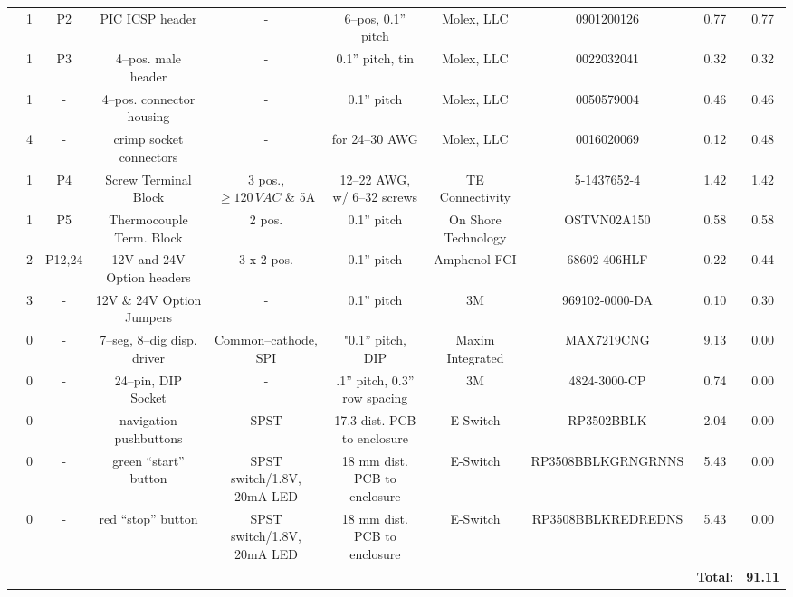 \documentclass[10pt, twocolumn]{article}
\begin{document}
\begin{center}
\begin{adjustbox}{max width=\textwidth}
\begin{tabular}{c c c c c c c c c c}
	&1	&P2	&PIC ICSP header		&-				&6--pos, 0.1” pitch
	&Molex, LLC	&0901200126			&0.77		&0.77	\\

	&1	&P3	&4--pos. male header		&-				&0.1'' pitch, tin
	&Molex, LLC		&0022032041		&0.32		&0.32	\\

	&1	&-	&4--pos. connector housing	&-			&0.1'' pitch
	&Molex, LLC		&0050579004		&0.46		&0.46	\\

	&4	&-	&crimp socket connectors	&-			&for 24--30 AWG
	&Molex, LLC		&0016020069		&0.12		&0.48	\\

	&1	&P4	&Screw Terminal Block		&3 pos., $\geq120\,VAC$ \& 5A	&12--22 AWG, w/ 6--32 screws
	&TE Connectivity	&5-1437652-4		&1.42		&1.42	\\

	&1	&P5	&Thermocouple Term. Block	&2 pos.				&0.1'' pitch
	&On Shore Technology	&OSTVN02A150		&0.58		&0.58	\\

	&2	&P12,24	&12V and 24V Option headers	&3 x 2 pos.			&0.1'' pitch
	&Amphenol FCI		&68602-406HLF		&0.22		&0.44	\\

	&3	&-	&12V \& 24V Option Jumpers	&-				&0.1'' pitch
	&3M			&969102-0000-DA		&0.10		&0.30	\\

	&0	&-	&7--seg, 8--dig disp. driver	&Common--cathode, SPI	&"0.1” pitch, DIP
	&Maxim Integrated	&MAX7219CNG		&9.13		&0.00	\\

	&0	&-	&24--pin, DIP Socket		&-				&.1” pitch, 0.3” row spacing
	&3M		&4824-3000-CP			&0.74		&0.00	\\

	&0	&-	&navigation pushbuttons	&SPST				&17.3 dist. PCB to enclosure
	&E-Switch		&RP3502BBLK		&2.04		&0.00	\\

	&0	&-	&green “start” button	&SPST switch/1.8V, 20mA LED	&18 mm dist. PCB to enclosure
	&E-Switch		&RP3508BBLKGRNGRNNS	&5.43		&0.00	\\

	&0	&-	&red “stop” button	&SPST switch/1.8V, 20mA LED	&18 mm dist. PCB to enclosure
	&E-Switch		&RP3508BBLKREDREDNS	&5.43		&0.00	\\

	&	&	&			&				&
	&			&			&\textbf{Total:}	&\textbf{91.11}	\\
\hline\hline
\end{tabular}
\end{adjustbox}
\label{digikey-bill-of-materials}
\end{center}
\end{document}
